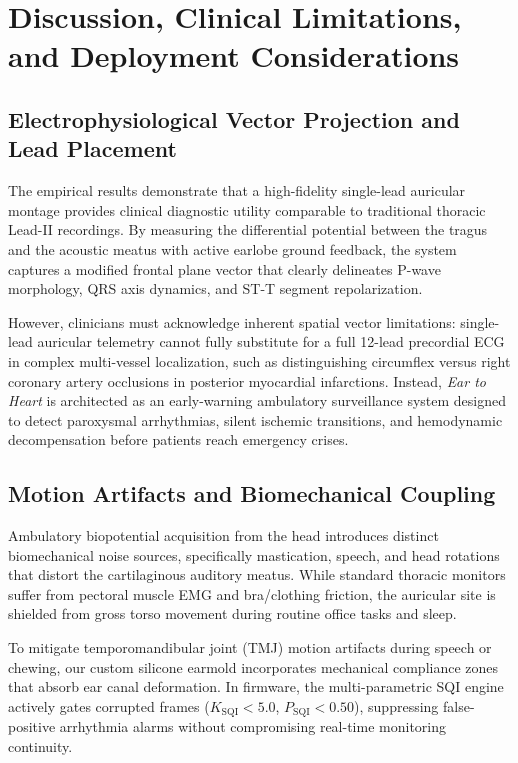 \section{Discussion, Clinical Limitations, and Deployment Considerations}
\label{sec:discussion}

\subsection{Electrophysiological Vector Projection and Lead Placement}
The empirical results demonstrate that a high-fidelity single-lead auricular montage provides clinical diagnostic utility comparable to traditional thoracic Lead-II recordings. By measuring the differential potential between the tragus and the acoustic meatus with active earlobe ground feedback, the system captures a modified frontal plane vector that clearly delineates P-wave morphology, QRS axis dynamics, and ST-T segment repolarization. 

However, clinicians must acknowledge inherent spatial vector limitations: single-lead auricular telemetry cannot fully substitute for a full 12-lead precordial ECG in complex multi-vessel localization, such as distinguishing circumflex versus right coronary artery occlusions in posterior myocardial infarctions. Instead, \textit{Ear to Heart} is architected as an early-warning ambulatory surveillance system designed to detect paroxysmal arrhythmias, silent ischemic transitions, and hemodynamic decompensation before patients reach emergency crises.

\subsection{Motion Artifacts and Biomechanical Coupling}
Ambulatory biopotential acquisition from the head introduces distinct biomechanical noise sources, specifically mastication, speech, and head rotations that distort the cartilaginous auditory meatus. While standard thoracic monitors suffer from pectoral muscle EMG and bra/clothing friction, the auricular site is shielded from gross torso movement during routine office tasks and sleep.

To mitigate temporomandibular joint (TMJ) motion artifacts during speech or chewing, our custom silicone earmold incorporates mechanical compliance zones that absorb ear canal deformation. In firmware, the multi-parametric SQI engine actively gates corrupted frames ($K_{\text{SQI}} < 5.0$, $P_{\text{SQI}} < 0.50$), suppressing false-positive arrhythmia alarms without compromising real-time monitoring continuity.

